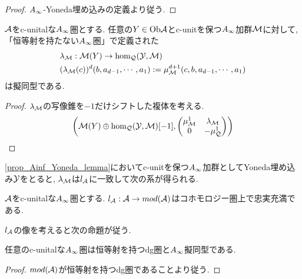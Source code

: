 \documentclass[uplatex, a4paper, 14Q, dvipdfmx]{jsarticle}
\begin{document}
\begin{proof}
  $A_{\infty}$-Yoneda埋め込みの定義より従う. 
\end{proof}

\begin{lemma} \label{prop_Ainf_Yoneda_lemma}
  $\mathcal{A}$をc-unitalな$A_{\infty}$圏とする. 
  任意の$Y \in \mathrm{Ob}\mathcal{A}$とc-unitを保つ$A_{\infty}$加群$\mathcal{M}$に対して, 「恒等射を持たない$A_{\infty}$圏」で定義された
  \begin{align*}
    &\lambda_{\mathcal{M}} : \mathcal{M}(Y) \to \hom_{\mathcal{Q}}(\mathcal{Y},\mathcal{M}) \\
    &(\lambda_{\mathcal{M}}(c))^d(b,a_{d-1},\cdots,a_1) := \mu^{d+1}_{\mathcal{M}}(c,b,a_{d-1},\cdots,a_1)
  \end{align*}
  は擬同型である. 
\end{lemma}

\begin{proof}
  $\lambda_{\mathcal{M}}$の写像錐を$-1$だけシフトした複体を考える.
  \begin{align*}
    \qty(\mathcal{M}(Y) \oplus \hom_{\mathcal{Q}}(\mathcal{Y},\mathcal{M})[-1], 
    \begin{pmatrix}
      \mu^1_{\mathcal{M}} & \lambda_{\mathcal{M}} \\
      0 & -\mu^1_{\mathcal{Q}}
    \end{pmatrix})
  \end{align*} 
\end{proof}

\cref{prop_Ainf_Yoneda_lemma}においてc-unitを保つ$A_{\infty}$加群としてYoneda埋め込み$\mathcal{Y}$をとると, $\lambda_{\mathcal{M}}$は$l_{\mathcal{A}}$に一致して次の系が得られる.

\begin{corollary} \label{prop_l_A_is_cohomologically_fully_faithful}
  $\mathcal{A}$をc-unitalな$A_{\infty}$圏とする. 
  $l_{\mathcal{A}} : \mathcal{A} \to mod (\mathcal{A})$はコホモロジー圏上で忠実充満である. 
\end{corollary}

$l_{\mathcal{A}}$の像を考えると次の命題が従う. 

\begin{corollary} \label{prop_Ainf_Yoneda_ver0}
  任意のc-unitalな$A_{\infty}$圏は恒等射を持つdg圏と$A_{\infty}$擬同型である. 
\end{corollary}

\begin{proof}
  $mod (\mathcal{A})$が恒等射を持つdg圏であることより従う. 
\end{proof}




\end{document}
